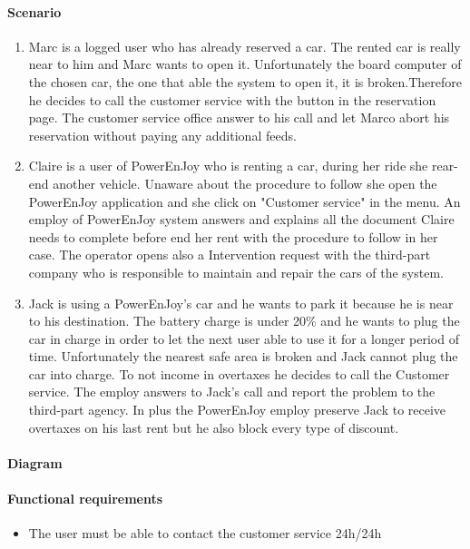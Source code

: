 \paragraph{Scenario}
\begin{enumerate}
	\item Marc is a logged user who has already reserved a car. The rented car is really near to him and Marc wants to open it. Unfortunately the board computer of the chosen car, the one that able the system to open it, it is broken.Therefore he decides to call the customer service with the button in the reservation page. The customer service office answer to his call and let Marco abort his reservation without paying any additional feeds.
	\item Claire is a user of PowerEnJoy who is renting a car, during her ride she rear-end another vehicle. Unaware about the procedure to follow she open the PowerEnJoy application and she click on "Customer service" in the menu. An employ of PowerEnJoy system answers and explains all the document Claire needs to complete before end her rent with the procedure to follow in her case. The operator opens also a Intervention request with the third-part company who is responsible to maintain and repair the cars of the system.
	\item Jack is using a PowerEnJoy's car and he wants to park it because he is near to his destination. The battery charge is under 20\% and he wants to plug the car in charge in order to let the next user able to use it for a longer period of time. Unfortunately the nearest safe area is broken and Jack cannot plug the car into charge. To not income in overtaxes he decides to call the Customer service. The employ answers to Jack's call and report the problem to the third-part agency. In plus the PowerEnJoy employ preserve Jack to receive overtaxes on his last rent but he also block every type of discount.
\end{enumerate}
\paragraph{Diagram}
\paragraph {Functional requirements }
\begin{itemize}
	\item The user must be able to contact the customer service 24h/24h
\end{itemize}

